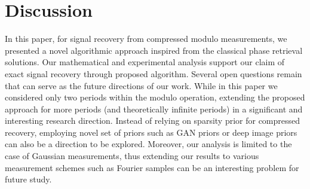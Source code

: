 \section{Discussion}
\label{sec:disc}
In this paper, for signal recovery from compressed modulo measurements, we presented a novel algorithmic approach inspired from the classical phase retrieval solutions. Our mathematical and experimental analysis support our claim of exact signal recovery through proposed algorithm. Several open questions remain that can serve as the future directions of our work. While in this paper we considered only two periods within the modulo operation, extending the proposed approach for more periods (and theoretically infinite periods) in a significant and interesting research direction. Instead of relying on sparsity prior for compressed recovery, employing novel set of priors such as GAN priors\cite{bora2017compressed,shah2018solving} or deep image priors \cite{lacoste2017deep} can also be a direction to be explored. Moreover, our analysis is limited to the case of Gaussian measurements, thus extending our results to various measurement schemes such as Fourier samples can be an interesting problem for future study. 